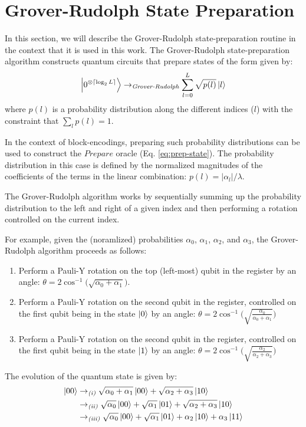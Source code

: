 \section{Grover-Rudolph State Preparation}
\label{sec:grover-rudolph}

In this section, we will describe the Grover-Rudolph state-preparation routine \cite{grover2002creating} in the context that it is used in this work.
The Grover-Rudolph state-preparation algorithm constructs quantum circuits that prepare states of the form given by:
\begin{equation}
    \ket{0^{\otimes \lceil \log_2{L} \rceil}} \rightarrow_{\textit{Grover-Rudolph}} \sum_{l=0}^L \sqrt{p(l)} \ket{l}
\end{equation}
where $p(l)$ is a probability distribution along the different indices ($l$) with the constraint that $\sum_l p(l) = 1$.

In the context of block-encodings, preparing such probability distributions can be used to construct the $Prepare$ oracle (Eq. \ref{eq:prep-state}).
The probability distribution in this case is defined by the normalized magnitudes of the coefficients of the terms in the linear combination: $p(l) = |\alpha_l| / \lambda$.

The Grover-Rudolph algorithm works by sequentially summing up the probability distribution to the left and right of a given index and then performing a rotation controlled on the current index.

For example, given the (noramlized) probabilities $\alpha_0$, $\alpha_1$, $\alpha_2$, and $\alpha_3$, the Grover-Rudolph algorithm proceeds as follows:
\begin{enumerate}
    \item Perform a Pauli-Y rotation on the top (left-most) qubit in the register by an angle: $\theta = 2 \cos^{-1}\big( \sqrt{\alpha_0 + \alpha_1} \big)$.
    \item Perform a Pauli-Y rotation on the second qubit in the register, controlled on the first qubit being in the state $\ket{0}$ by an angle: $\theta = 2 \cos^{-1}\big( \sqrt{\frac{\alpha_0}{\alpha_0 + \alpha_1}} \big)$
    \item Perform a Pauli-Y rotation on the second qubit in the register, controlled on the first qubit being in the state $\ket{1}$ by an angle: $\theta = 2 \cos^{-1}\big( \sqrt{\frac{\alpha_2}{\alpha_2 + \alpha_3}} \big)$
\end{enumerate}

The evolution of the quantum state is given by:
\begin{equation}
    \begin{split}
        \ket{00} &\rightarrow_{\textit{(i)}} \sqrt{\alpha_0 + \alpha_1} \ket{00} + \sqrt{\alpha_2 + \alpha_3} \ket{10} \\
        &\rightarrow_{\textit{(ii)}} \sqrt{\alpha_0} \ket{00} + \sqrt{\alpha_1} \ket{01} + \sqrt{\alpha_2 + \alpha_3} \ket{10} \\
        &\rightarrow_{\textit{(iii)}} \sqrt{\alpha_0} \ket{00} + \sqrt{\alpha_1} \ket{01} + \alpha_2 \ket{10} + \alpha_3 \ket{11}
    \end{split}
\end{equation}

